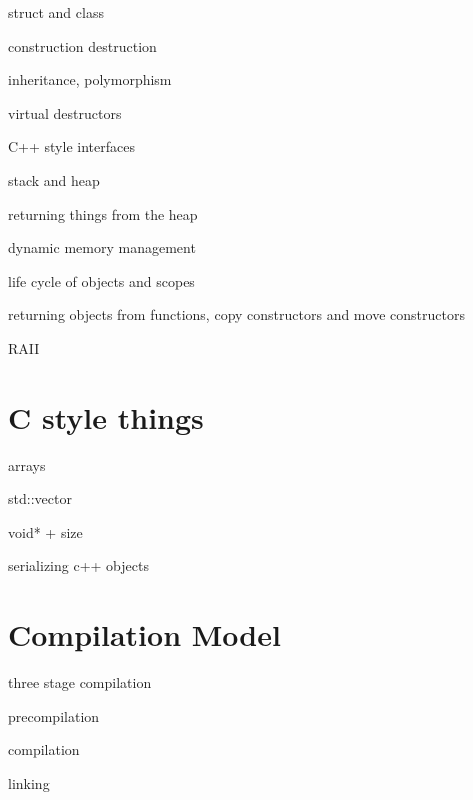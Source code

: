 \documentclass[aspectratio=169]{beamer}
\begin{document}
\begin{frame}
  struct and class

  construction destruction
\end{frame}

\begin{frame}
  inheritance, polymorphism

  virtual destructors
\end{frame}

\begin{frame}
  C++ style interfaces

\end{frame}

\begin{frame}
  stack and heap
\end{frame}

\begin{frame}
  returning things from the heap

  dynamic memory management
\end{frame}

\begin{frame}
  life cycle of objects and scopes

  returning objects from functions, copy constructors and move constructors
\end{frame}

\begin{frame}
  RAII  
\end{frame}

\section{C style things}

\begin{frame}
  arrays

  std::vector

  void* + size

  serializing c++ objects
\end{frame}

\section{Compilation Model}

\begin{frame}
  three stage compilation

  precompilation

  compilation

  linking  
\end{frame}
\end{document}
